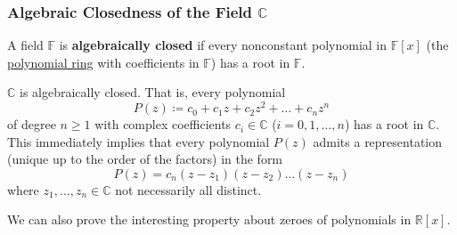    \subsubsection[Algebraic Closedness of the Field C]{Algebraic Closedness of the Field $\mathbb{C}$}

    \begin{definition}
      \label{def:algebraically-closed-field}
      A field $\mathbb{F}$ is \textbf{algebraically closed} if every nonconstant polynomial in $\mathbb{F}[x]$ (the \hyperref[alg-def:polynomial-ring]{polynomial ring} with coefficients in $\mathbb{F}$) has a root in $\mathbb{F}$. 
    \end{definition}

    \begin{theorem}
      \label{thm:fundamental-theorem-of-algebra}
    $\mathbb{C}$ is algebraically closed. That is, every polynomial 
    \begin{equation}
      P(z) \coloneqq c_0 + c_1 z + c_2 z^2 + \ldots + c_n z^n
    \end{equation}
    of degree $n\geq 1$ with complex coefficients $c_i \in \mathbb{C}$ ($i = 0, 1, \ldots, n$) has a root in $\mathbb{C}$. This immediately implies that every polynomial $P(z)$ admits a representation (unique up to the order of the factors) in the form 
    \begin{equation}
      P(z) = c_n (z - z_1) (z - z_2) \ldots (z - z_n)
    \end{equation}
    where $z_1, \ldots, z_n \in \mathbb{C}$ not necessarily all distinct. 
    \end{theorem}

    We can also prove the interesting property about zeroes of polynomials in $\mathbb{R}[x]$. 

